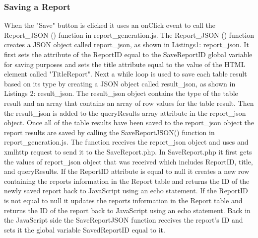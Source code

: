 \documentclass[../final.tex]{subfiles}
\begin{document}
	\subsubsection{Saving a Report}
	When the "Save" button is clicked it uses an onClick event to call the Report\_JSON () function in report\_generation.js. The Report\_JSON () function creates a JSON object called report\_json, as shown in Listings1: report\_json. It first sets the attribute of the ReportID equal to the SaveReportID global variable for saving purposes and sets the title attribute equal to the value of the HTML element called "TitleReport". Next a while loop is used to save each table result based on its type by creating a JSON object called result\_json, as shown in Listings 2: result\_json. The result\_json object contains the type of the table result and an array that contains an array of row values for the table result. Then the result\_json is added to the queryResults array attribute in the report\_json object. Once all of the table results have been saved to the report\_json object the report results are saved by calling the SaveReportJSON() function in report\_generation.js. The function receives the report\_json object and uses and xmlhttp request to send it to the SaveReport.php. In SaveReport.php it first gets the values of report\_json object that was received which includes ReportID, title, and queryResults. If the ReportID attribute is equal to null it creates a new row containing the reports information in the Report table and returns the ID of the newly saved report back to JavaScript using an echo statement. If the ReportID is not equal to null it updates the reports information in the Report table and returns the ID of the report back to JavaScript using an echo statement. Back in the JavaScript side the SaveReportJSON function receives the report's ID and sets it the global variable SavedReportID equal to it. 
	
\end{document}
